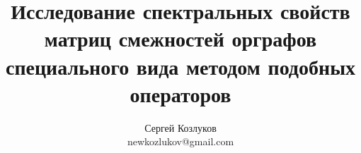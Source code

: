\documentclass[11pt,a4paper]{article}
\title{Исследование спектральных свойств матриц
смежностей орграфов специального вида
методом подобных операторов}
\author{Сергей Козлуков \\ newkozlukov@gmail.com}
\begin{document}
\maketitle

\begin{abstract}
    
\end{abstract}




{}

\end{document}
